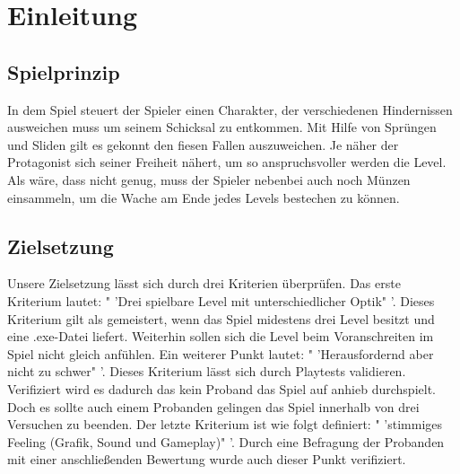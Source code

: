 \documentclass[12pt]{article}
\begin{document}

%

\newpage

\tableofcontents

\newpage
	
\section{Einleitung}

\vspace{2cm}
\subsection{Spielprinzip}

In dem Spiel steuert der Spieler einen Charakter, der verschiedenen Hindernissen ausweichen muss um seinem Schicksal zu entkommen. Mit Hilfe von
Sprüngen und Sliden gilt es gekonnt den fiesen Fallen auszuweichen. Je näher der Protagonist sich seiner Freiheit nähert, um so anspruchsvoller werden die Level.
Als wäre, dass nicht genug, muss der Spieler nebenbei auch noch Münzen einsammeln, um die Wache am Ende jedes Levels bestechen zu können.

\vspace{2cm}
\subsection{Zielsetzung}

Unsere Zielsetzung lässt sich durch drei Kriterien überprüfen.\newline
Das erste Kriterium lautet: " 'Drei spielbare Level mit unterschiedlicher Optik" '. Dieses
Kriterium gilt als gemeistert, wenn das Spiel midestens drei Level besitzt und eine .exe-Datei liefert. Weiterhin sollen sich die Level beim Voranschreiten im
Spiel nicht gleich anfühlen.\newline
Ein weiterer Punkt lautet: " 'Herausfordernd aber nicht zu schwer" '. Dieses Kriterium lässt sich durch Playtests validieren. Verifiziert wird es dadurch das
kein Proband das Spiel auf anhieb durchspielt. Doch es sollte auch einem Probanden gelingen das Spiel innerhalb von drei Versuchen zu beenden.\newline
Der letzte Kriterium ist wie folgt definiert: " 'stimmiges Feeling (Grafik, Sound und Gameplay)" '. Durch eine Befragung der Probanden mit einer anschließenden
Bewertung wurde auch dieser Punkt verifiziert.

\vspace{2cm}
\end{document}
